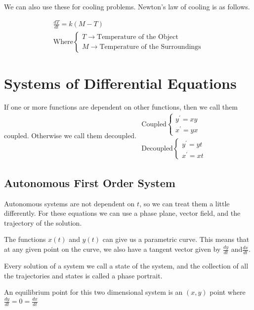 \documentclass[12pt,landscape,twocolumn]{article}
\begin{document}
    We can also use these for cooling problems. Newton's law of cooling is as follows.

    \begin{equation}\label{eq:newtoncool}
    \begin{aligned}
    \frac{dT}{dt} = k (M - T)\\
    \text{Where}
    \begin{cases}
    T \to \text{Temperature of the Object}\\
    M \to \text{Temperature of the Surroundings}
    \end{cases}
    \end{aligned}
    \end{equation}


\section{Systems of Differential Equations}
If one or more functions are dependent on other functions, then we call them coupled. Otherwise we call them decoupled.
$
\begin{aligned}
\text{Coupled}
\begin{cases}
y^\prime = xy\\
x^\prime = yx
\end{cases}\\
\text{Decoupled}
\begin{cases}
y^\prime = yt\\
x^\prime = xt
\end{cases}
\end{aligned}
$

    \subsection{Autonomous First Order System}
    Autonomous systems are not dependent on $t$, so we can treat them a little differently. For these equations we can use a phase plane, vector field, and the trajectory of the solution.

    The functions $x(t)$ and $y(t)$ can give us a parametric curve. This means that at any given point on the curve, we also have a tangent vector given by $\frac{dy}{dt}$ and$\frac{dx}{dt}$.

    Every solution of a system we call a state of the system, and the collection of all the trajectories and states is called a phase portrait.

    An equilibrium point for this two dimensional system is an $(x,y)$ point where
    $
    \frac{dy}{dt} = 0 = \frac{dx}{dt}
    $
\end{document}
